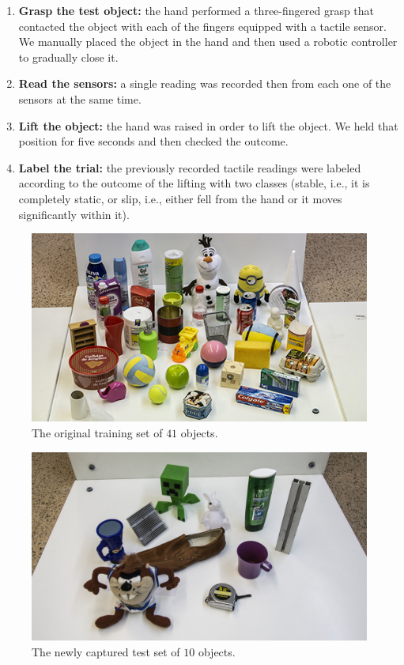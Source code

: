 \begin{enumerate}
	\item \textbf{Grasp the test object:} the hand performed a three-fingered grasp that contacted the object with each of the fingers equipped with a tactile sensor. We manually placed the object in the hand and then used a robotic controller to gradually close it.
	\item \textbf{Read the sensors:} a single reading was recorded then from each one of the sensors at the same time.
	\item \textbf{Lift the object:} the hand was raised in order to lift the object. We held that position for five seconds and then checked the outcome.
	\item \textbf{Label the trial:} the previously recorded tactile readings were labeled according to the outcome of the lifting with two classes (stable, i.e., it is completely static, or slip, i.e., either fell from the hand or it moves significantly within it).
\end{enumerate}

\begin{figure}[!htb]
	\centering
	\includegraphics[width=0.95\linewidth]{Figures/Tactile/dataset/trainobjects2-downsampled.jpg}
	\caption{The original training set of $41$ objects.}
	\label{fig:dataset_train}
\end{figure}

\begin{figure}[!htb]
	\centering
	\includegraphics[width=0.95\linewidth]{Figures/Tactile/dataset/testobjects.jpg}
	\caption{The newly captured test set of $10$ objects.}
	\label{fig:dataset_test}
\end{figure}

